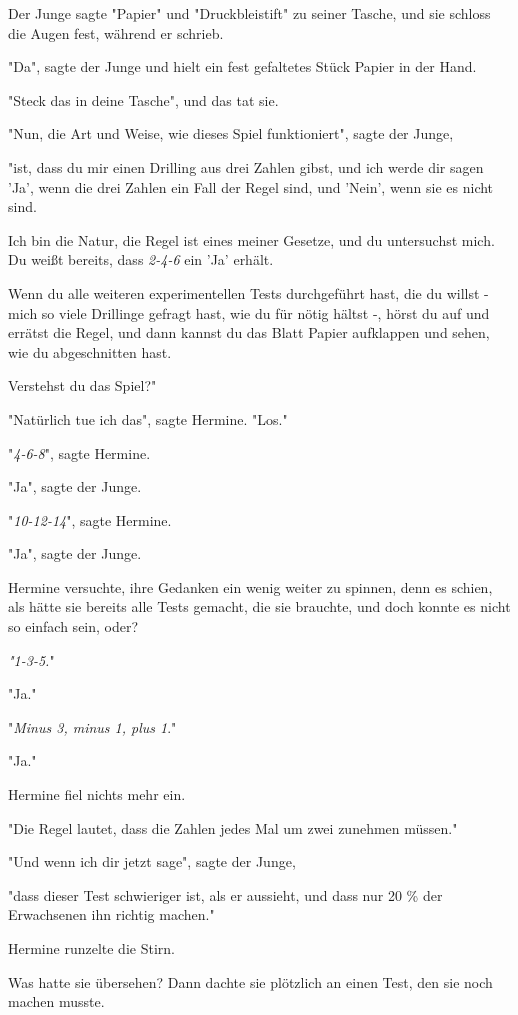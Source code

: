 {Der Junge sagte "Papier" und "Druckbleistift" zu seiner Tasche, und sie schloss die Augen fest, während er schrieb.

"Da", sagte der Junge und hielt ein fest gefaltetes Stück Papier in der Hand.

"Steck das in deine Tasche", und das tat sie.

"Nun, die Art und Weise, wie dieses Spiel funktioniert", sagte der Junge,

"ist, dass du mir einen Drilling aus drei Zahlen gibst, und ich werde dir sagen 'Ja', wenn die drei Zahlen ein Fall der Regel sind, und 'Nein', wenn sie es nicht sind.

Ich bin die Natur, die Regel ist eines meiner Gesetze, und du untersuchst mich. Du weißt bereits, dass \emph{2-4-6} ein 'Ja' erhält.

Wenn du alle weiteren experimentellen Tests durchgeführt hast, die du willst - mich so viele Drillinge gefragt hast, wie du für nötig hältst -, hörst du auf und errätst die Regel, und dann kannst du das Blatt Papier aufklappen und sehen, wie du abgeschnitten hast.

Verstehst du das Spiel?"

"Natürlich tue ich das", sagte Hermine. "Los."

"\emph{4-6-8}", sagte Hermine.

"Ja", sagte der Junge.

"\emph{10-12-14}", sagte Hermine.

"Ja", sagte der Junge.

Hermine versuchte, ihre Gedanken ein wenig weiter zu spinnen, denn es schien, als hätte sie bereits alle Tests gemacht, die sie brauchte, und doch konnte es nicht so einfach sein, oder?

\emph{"1-3-5.}"

"Ja."

"\emph{Minus 3, minus 1, plus 1}."

"Ja."

Hermine fiel nichts mehr ein.

"Die Regel lautet, dass die Zahlen jedes Mal um zwei zunehmen müssen."

"Und wenn ich dir jetzt sage", sagte der Junge,

"dass dieser Test schwieriger ist, als er aussieht, und dass nur 20 \% der Erwachsenen ihn richtig machen."

Hermine runzelte die Stirn.

Was hatte sie übersehen? Dann dachte sie plötzlich an einen Test, den sie noch machen musste.

}
